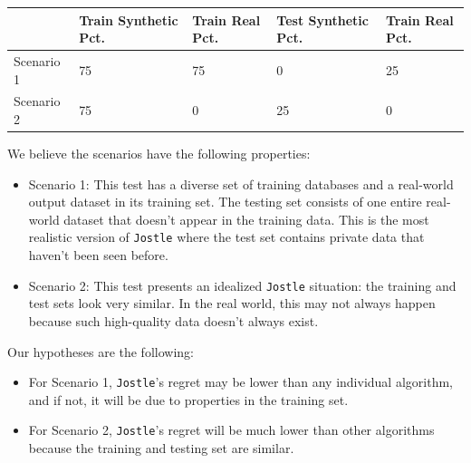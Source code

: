 \documentclass[11pt]{report}
\newcommand{\Jostle}{\texttt{Jostle}}
\begin{document}
\begin{center}
\begin{tabular}{|p{2cm}|p{2cm}|p{2cm}|p{2cm}|p{2cm}|}
\hline
\; & Train Synthetic Pct. & Train Real Pct. & Test Synthetic Pct. & Train Real Pct. \\ \hline
Scenario 1 & 75 & 75 & 0 & 25 \\ \hline
Scenario 2 & 75 & 0 & 25 & 0\\ \hline
\end{tabular}
\end{center}
We believe the scenarios have the following properties:
\begin{itemize}
\item{Scenario 1: This test has a diverse set of training databases and a real-world output dataset in its training set. The testing set consists of one entire real-world dataset that doesn't appear in the training data. This is the most realistic version of \Jostle{} where the test set contains private data that haven't been seen before.}
\item{Scenario 2: This test presents an idealized \Jostle{} situation: the training and test sets look very similar. In the real world, this may not always happen because such high-quality data doesn't always exist.}
\end{itemize}
Our hypotheses are the following:
\begin{itemize}
\item For Scenario 1, \Jostle{}'s regret may be lower than any individual algorithm, and if not, it will be due to properties in the training set.
\item For Scenario 2, \Jostle{}'s regret will be much lower than other algorithms because the training and testing set are similar.
\end{itemize}
\end{document}
